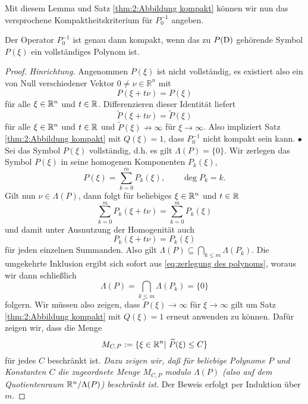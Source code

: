 Mit diesem Lemma und Satz \ref{thm:2:Abbildung kompakt} können wir nun das versprochene Kompaktheitskriterium für $P_0^{-1}$ angeben.
\begin{thm}\label{thm:2.17}
Der Operator $P_0^{-1}$ ist genau dann kompakt, wenn das zu $P(\mathrm D)$ gehörende Symbol $P(\xi)$ ein vollständiges Polynom ist.
\end{thm}
\begin{proof}{\em Hinrichtung.}
Angenommen $P(\xi)$ ist nicht vollständig, es existiert also ein von Null verschiedener Vektor $0 \not = \nu \in \mathbb{R}^n$ mit
\begin{equation}
P(\xi + t \nu)  = P(\xi)
\end{equation}
für alle $\xi\in\mathbb R^n$ und $t\in\mathbb R$. Differenzieren dieser Identität liefert
\begin{equation}
\widetilde{P}(\xi + t \nu) = \widetilde{P}(\xi)
\end{equation}
für alle $\xi\in\mathbb R^n$ und $t\in\mathbb R$ und $\widetilde{P}(\xi) \not \rightarrow \infty$ für $\xi \rightarrow \infty$. Also impliziert Satz \ref{thm:2:Abbildung kompakt} mit $Q(\xi)=1$, dass $P_0^{-1}$ nicht kompakt sein kann. $\bullet$ Sei das Symbol $P(\xi)$ vollständig, d.h. es gilt $\Lambda (P)= \{0\}$. Wir zerlegen das Symbol $P(\xi)$ in seine homogenen Komponenten $P_k(\xi)$, 
\begin{equation}\label{eq:zerlegung des polynoms}
P(\xi) = \sum_{k=0}^m P_k(\xi),\qquad \deg P_k=k.
\end{equation}
Gilt nun $\nu \in \Lambda (P)$, dann folgt für beliebiges $\xi\in\mathbb R^n$ und $t\in\mathbb R$
\begin{equation}
\sum_{k=0}^m P_k (\xi + t \nu) = \sum_{k=0}^m P_k (\xi)
\end{equation}
und damit unter Ausnutzung der Homogenität auch
\begin{equation}
P_k (\xi + t \nu) = P_k (\xi) 
\end{equation}
für jeden einzelnen Summanden. Also gilt $\Lambda(P) \subseteq \bigcap_{k \leq m} \Lambda (P_k)$. Die umgekehrte Inklusion ergibt sich sofort aus \eqref{eq:zerlegung des polynoms}, woraus wir dann schließlich
\begin{equation}\label{eq:schnitt der homogenen teile}
\Lambda(P) = \bigcap_{k \leq m} \Lambda (P_k) = \{0\}
\end{equation}
folgern. Wir müssen also zeigen, dass $\widetilde{P}(\xi) \rightarrow \infty$ für $\xi \rightarrow \infty$ gilt um Satz \ref{thm:2:Abbildung kompakt} mit $Q(\xi) =1$ erneut anwenden zu können. Dafür zeigen wir, dass die Menge
\begin{equation}
M_{C,P} := \{\xi \in \mathbb R^n | \ \widetilde{P}(\xi) \leq C\}
\end{equation}
für jedes $C$ beschränkt ist. {\em Dazu zeigen wir, daß für beliebige Polynome $P$ und Konstanten $C$ die zugeordnete Menge $M_{C,P}$ modulo $\Lambda(P)$ (also auf dem Quotientenraum $\mathbb R^n/\Lambda(P)$) beschränkt ist.} Der Beweis erfolgt per Induktion über $m$.


\end{proof}
